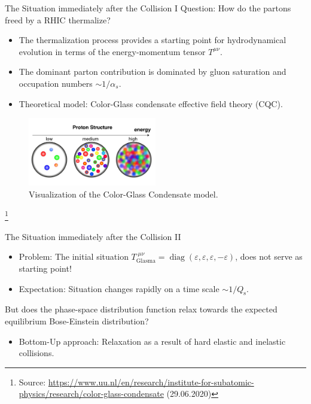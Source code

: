 \begin{frame}{The Situation immediately after the Collision I}
\vspace{0.5em}
\alert{Question}: How do the partons freed by a RHIC thermalize?\\[0.5em]

\begin{itemize}
	\item The thermalization process provides a starting point for \alert{hydrodynamical evolution} in terms of the \alert{energy-momentum tensor} $T^{\mu\nu}$.
	\item The dominant parton contribution is dominated by \alert{gluon saturation} and occupation numbers $\sim 1/\alpha_s$.
	\item Theoretical model: \alert{Color-Glass condensate} effective field theory (CQC).
\end{itemize}
\begin{figure}
	\centering
	\includegraphics[width=0.5\textwidth]{figures/cqc}
	\caption{Visualization of the Color-Glass Condensate model.\footnotemark}
\end{figure}
\footnote{Source: \tiny\url{https://www.uu.nl/en/research/institute-for-subatomic-physics/research/color-glass-condensate} (29.06.2020)}
\end{frame}

\begin{frame}{The Situation immediately after the Collision II}
\begin{itemize}
	\item \alert{Problem:} The initial situation $T^{\phantom{.}\mu\nu}_{\mathrm{Glasma}} = \operatorname{diag}(\varepsilon,\varepsilon,\varepsilon,-\varepsilon)$, does \alert{not} serve as starting point!
	\item \alert{Expectation:} Situation changes rapidly on a time scale $\sim 1/Q_{\mathrm{s}}$.
\end{itemize}
\vspace{0.5em}	
But does the phase-space distribution function relax towards the expected equilibrium \alert{Bose-Einstein distribution}?\\[0.5em]
\begin{itemize}
	\item \alert{Bottom-Up approach:} Relaxation as a result of hard elastic and inelastic collisions. 
\end{itemize}
\end{frame}


